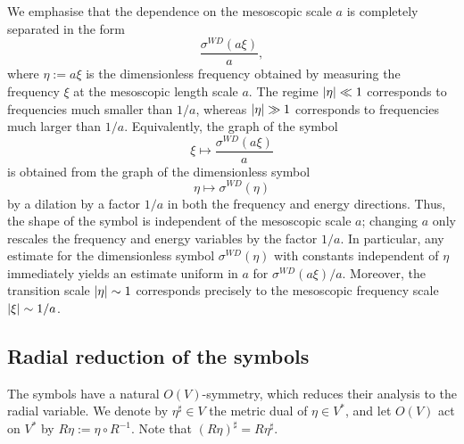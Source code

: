 \documentclass[a4paper,oneside,12pt]{amsart}
\theoremstyle{plain}
\theoremstyle{definition}
\theoremstyle{remark}
\DeclarePairedDelimiter{\abs}{\lvert}{\rvert}
\newcommand{\symbolWilsonDirac}{\sigma^{\mathit{WD}}}
\begin{document}
We emphasise that the dependence on the mesoscopic scale $a$ is completely separated in the form
\begin{equation}
  \frac{\symbolWilsonDirac(a\xi)}{a},
\end{equation}
where $\eta:=a\xi$ is the dimensionless frequency obtained by measuring the frequency $\xi$ at the mesoscopic length scale $a$.
The regime $\abs{\eta} \ll 1$ corresponds to frequencies much smaller than $1/a$, whereas $\abs{\eta} \gg 1$ corresponds to frequencies much larger than $1/a$.
Equivalently, the graph of the symbol
\begin{equation}
  \xi \mapsto \frac{\symbolWilsonDirac(a\xi)}{a}
\end{equation}
is obtained from the graph of the dimensionless symbol
\begin{equation}
  \eta \mapsto \symbolWilsonDirac(\eta)
\end{equation}
by a dilation by a factor $1/a$ in both the frequency and energy directions.
Thus, the shape of the symbol is independent of the mesoscopic scale $a$; changing $a$ only rescales the frequency and energy variables by the factor $1/a$.
In particular, any estimate for the dimensionless symbol $\symbolWilsonDirac(\eta)$ with constants independent of $\eta$ immediately yields an estimate uniform in $a$ for $\symbolWilsonDirac(a\xi)/a$.
Moreover, the transition scale $\abs{\eta} \sim 1$ corresponds precisely to the mesoscopic frequency scale $\abs{\xi} \sim 1/a$.

\subsection{Radial reduction of the symbols}

The symbols have a natural $O(V)$-symmetry, which reduces their analysis to the radial variable.
We denote by $\eta^{\sharp} \in V$ the metric dual of $\eta \in V^*$, and let $O(V)$ act on $V^*$ by $R \eta := \eta \circ R^{-1}$.
Note that $(R\eta)^{\sharp} = R \eta^{\sharp}$.
\end{document}
